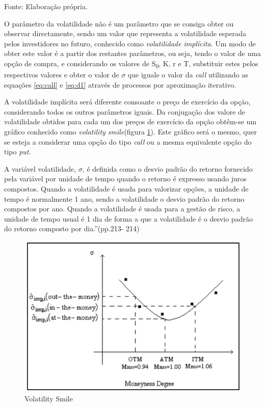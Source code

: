 \documentclass[
  12pt,
  a4paper,
  openany]{book}
\begin{document}
Fonte: Elaboração própria.

\justifying
\bigskip

O parâmetro da volatilidade não é um parâmetro que se consiga obter ou observar directamente, sendo um valor que representa a volatilidade esperada pelos investidores no futuro, conhecido como \emph{volatilidade implícita}. Um modo de obter este valor é a partir dos restantes parâmetros, ou seja, tendo o valor de uma opção de compra, e considerando os valores de S\textsubscript{0}, K, r e T, substituir estes pelos respectivos valores e obter o valor de \(\sigma\) que iguale o valor da \emph{call} utilizando as equações \eqref{eq:call} e \eqref{eq:d1} através de processos por aproximação iterativo.

A volatilidade implícita será diferente consoante o preço de exercício da opção, considerando todos os outros parâmetros iguais. Da conjugação dos valore de volatilidade obtidos para cada um dos preços de exercício da opção obtêm-se um gráfico conhecido como \emph{volatility smile}(figura \ref{fig:volatilitysmile}). Este gráfico será o mesmo, quer se esteja a considerar uma opção do tipo \emph{call} ou a mesma equivalente opção do tipo \emph{put}.

A variável volatilidade, \(\sigma\), é definida como o desvio padrão do retorno fornecido pela
variável por unidade de tempo quando o retorno é expresso usando juros compostos.
Quando a volatilidade é usada para valorizar opções, a unidade de tempo é normalmente 1 ano, sendo a volatilidade o desvio padrão do retorno compostos por ano.
Quando a volatilidade é usada para a gestão de risco, a unidade de tempo usual é 1 dia
de forma a que a volatilidade é o desvio padrão do retorno composto por dia.''(pp.213-
214)

\begin{figure}

{\centering \includegraphics[width=0.6\linewidth]{image/volatilitysmile} 

}

\caption{Volatility Smile}\label{fig:volatilitysmile}
\end{figure}
\FloatBarrier
\centering
\end{document}
